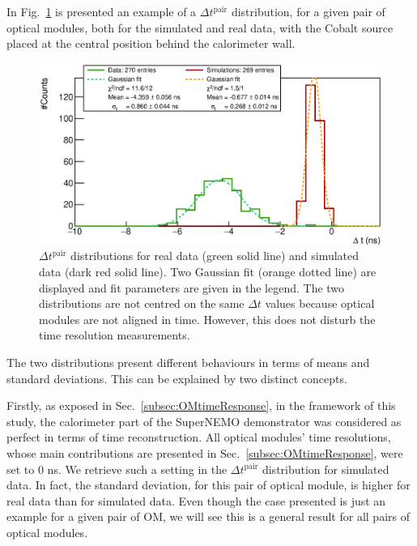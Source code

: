 In Fig.~\ref{fig:Co_deltat} is presented an example of a $\Delta t^{\text{pair}}$ distribution, for a given pair of optical modules, both for the simulated and real data, with the Cobalt source placed at the central position behind the calorimeter wall.
\begin{figure}[h]
  \centering
  \includegraphics[width=15cm]{commissioning/fig_commissioning/Co_deltat_distrib_ex.eps}
  \caption{$\Delta t^{\text{pair}}$ distributions for real data (green solid line) and simulated data (dark red solid line).
    Two Gaussian fit (orange dotted line) are displayed and fit parameters are given in the legend.
    The two distributions are not centred on the same $\Delta t$ values because optical modules are not aligned in time.
    However, this does not disturb the time resolution measurements.
    \label{fig:Co_deltat}}
\end{figure}
The two distributions present different behaviours in terms of means and standard deviations.
This can be explained by two distinct concepts.

Firstly, as exposed in Sec.~\ref{subsec:OMtimeResponse}, in the framework of this study, the calorimeter part of the SuperNEMO demonstrator was considered as perfect in terms of time reconstruction.
All optical modules' time resolutions, whose main contributions are presented in Sec.~\ref{subsec:OMtimeResponse}, were set to $0$ ns.
We retrieve such a setting in the $\Delta t^{\text{pair}}$ distribution for simulated data.
In fact, the standard deviation, for this pair of optical module, is higher for real data than for simulated data.
Even though the case presented is just an example for a given pair of OM, we will see this is a general result for all pairs of optical modules.

